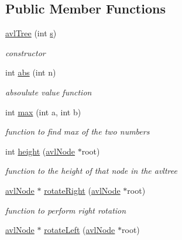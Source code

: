 \subsection*{Public Member Functions}
\begin{DoxyCompactItemize}
\item 
\hyperlink{class_a_v_lhash_1_1avl_tree_ac79205f64581690cb22123a895625450}{avl\-Tree} (int \hyperlink{class_a_v_lhash_1_1avl_tree_a98e40b4ee8d489d79db9e2a691bfedbb}{s})
\begin{DoxyCompactList}\small\item\em constructor \end{DoxyCompactList}\item 
int \hyperlink{class_a_v_lhash_1_1avl_tree_a791d79a8cb9a49de4bfd44e3a421c295}{abs} (int n)
\begin{DoxyCompactList}\small\item\em absoulute value function \end{DoxyCompactList}\item 
int \hyperlink{class_a_v_lhash_1_1avl_tree_a4e4dc9bb8d3d10f2bc859d7e7541b9ae}{max} (int a, int b)
\begin{DoxyCompactList}\small\item\em function to find max of the two numbers \end{DoxyCompactList}\item 
int \hyperlink{class_a_v_lhash_1_1avl_tree_a0dfea22e6ae84e779906c7afc33e2bae}{height} (\hyperlink{namespace_a_v_lhash_a09cd9142193c004fe02c59c9dbc29732}{avl\-Node} $\ast$root)
\begin{DoxyCompactList}\small\item\em function to the height of that node in the avltree \end{DoxyCompactList}\item 
\hyperlink{namespace_a_v_lhash_a09cd9142193c004fe02c59c9dbc29732}{avl\-Node} $\ast$ \hyperlink{class_a_v_lhash_1_1avl_tree_a2a8fa7233ffd52637d4e0b27489dc34f}{rotate\-Right} (\hyperlink{namespace_a_v_lhash_a09cd9142193c004fe02c59c9dbc29732}{avl\-Node} $\ast$root)
\begin{DoxyCompactList}\small\item\em function to perform right rotation \end{DoxyCompactList}\item 
\hyperlink{namespace_a_v_lhash_a09cd9142193c004fe02c59c9dbc29732}{avl\-Node} $\ast$ \hyperlink{class_a_v_lhash_1_1avl_tree_a5597f3e9d8679b11f4403a95ec029d29}{rotate\-Left} (\hyperlink{namespace_a_v_lhash_a09cd9142193c004fe02c59c9dbc29732}{avl\-Node} $\ast$root)

\end{DoxyCompactItemize}
